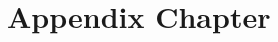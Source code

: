 \documentclass[a4paper, oneside]{csthesis}
\begin{document}







\appendix
\chapter{Appendix Chapter}
\end{document}
